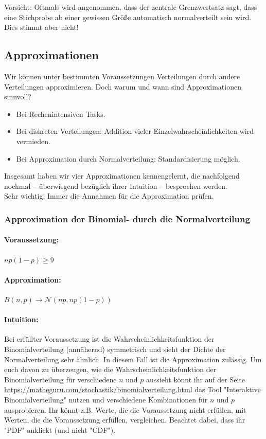 \documentclass[a4paper]{article}
\newcommand\dangersign[1][2ex]{%
  \renewcommand\stacktype{L}%
  \scaleto{\stackon[1.3pt]{\color{red}$\triangle$}{\tiny !}}{#1}%
}
\begin{document}
\noindent \dangersign[3ex] Vorsicht: Oftmals wird angenommen, dass der zentrale Grenzwertsatz sagt, dass eine Stichprobe ab einer gewissen Größe automatisch normalverteilt sein wird. Dies stimmt aber nicht!


\subsection{Approximationen}\label{sec:Approx}
Wir können unter bestimmten Voraussetzungen Verteilungen durch andere Verteilungen approximieren. Doch warum und wann sind Approximationen sinnvoll?

\begin{itemize}
    \item Bei Rechenintensiven Tasks.
    \item Bei  diskreten Verteilungen: Addition vieler Einzelwahrscheinlichkeiten wird vermieden.
    \item Bei Approximation durch Normalverteilung: Standardisierung möglich.
\end{itemize}

\noindent Insgesamt haben wir vier Approximationen kennengelernt, die nachfolgend nochmal -- überwiegend bezüglich ihrer Intuition -- besprochen werden.\\

\noindent \dangersign[3ex] Sehr wichtig: Immer die Annahmen für die Approximation prüfen.

\subsubsection{Approximation der Binomial- durch die Normalverteilung}\label{sec:BinN}

\paragraph{Voraussetzung:} $np(1-p) \geq 9$
\paragraph{Approximation:} $B(n,p) \rightarrow \mathcal{N}(np,np(1-p))$
\paragraph{Intuition:} Bei erfüllter Voraussetzung ist die Wahrscheinlichkeitsfunktion der Binomialverteilung (annähernd) symmetrisch und sieht der Dichte der Normalverteilung sehr ähnlich. In diesem Fall ist die Approximation zulässig. Um euch davon zu überzeugen, wie die Wahrscheinlichkeitsfunktion der Binomialverteilung für verschiedene $n$ und $p$ aussieht könnt ihr auf der Seite \url{https://matheguru.com/stochastik/binomialverteilung.html} das Tool "Interaktive Binomialverteilung" nutzen und verschiedene Kombinationen für $n$ und $p$ ausprobieren. Ihr könnt z.B. Werte, die die Voraussetzung nicht erfüllen, mit Werten, die die Voraussetzung erfüllen, vergleichen. Beachtet dabei, dass ihr "PDF" anklickt (und nicht "CDF").
\end{document}
